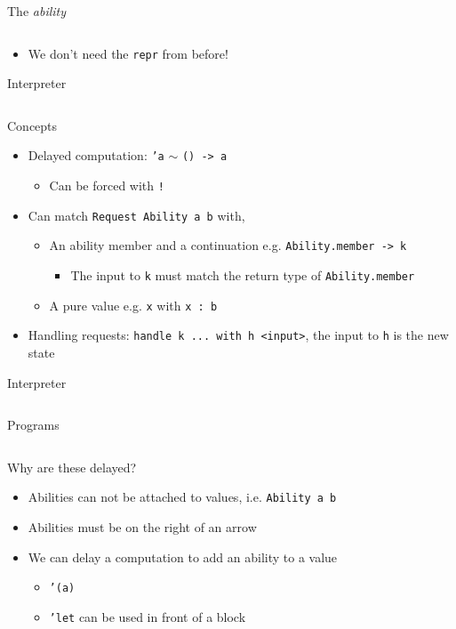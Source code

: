 \documentclass[hyperref={pdfpagelabels=false},12pt]{beamer}
\newcommand{\code}[2]{\texttt{#2}}
\newcommand{\haskell}[1]{\code{haskell}{#1}}
\newcommand{\txt}[1]{\code{text}{#1}}
\newcommand{\pygmentLines}[5]{\inputminted[bgcolor=lightgray,linenos,fontsize=#1,firstline=#2,lastline=#3,autogobble]{#4}{#5}}
\begin{document}
\begin{frame}{The \textit{ability}}
  \pygmentLines{\scriptsize}{41}{44}{haskell}{code/ability.u}
  \begin{itemize}
    \item We don't need the \haskell{repr} from before!
  \end{itemize}
\end{frame}

\begin{frame}{Interpreter}
  \pygmentLines{\footnotesize}{11}{21}{text}{code/ability.u}
\end{frame}

\begin{frame}{Concepts}
  \begin{itemize}
    \item Delayed computation: \txt{'a} $\sim$ \txt{() -> a}
    \begin{itemize}
      \item Can be forced with \txt{!}
    \end{itemize}
    \item Can match \txt{Request {Ability a} b} with,
      \begin{itemize}
        \item An ability member and a continuation e.g. \txt{{Ability.member -> k}}
        \begin{itemize}
          \item The input to \txt{k} must match the return type of
            \txt{Ability.member}
        \end{itemize}
        \item A pure value e.g. \txt{{x}} with \txt{x : b}
      \end{itemize}
    \item Handling requests: \txt{handle k ... with h <input>}, the input to
      \txt{h} is the new state
  \end{itemize}
\end{frame}

\begin{frame}{Interpreter}
  \pygmentLines{\footnotesize}{11}{21}{text}{code/ability.u}
\end{frame}

\begin{frame}{Programs}
  \pygmentLines{\footnotesize}{23}{40}{text}{code/ability.u}
\end{frame}

\begin{frame}{Why are these delayed?}
  \begin{itemize}
    \item Abilities can not be attached to values, i.e. \txt{{Ability a} b}
    \item Abilities must be on the right of an arrow
    \item We can delay a computation to add an ability to a value
    \begin{itemize}
      \item \txt{'(a)}
      \item \txt{'let} can be used in front of a block
    \end{itemize}
  \end{itemize}
\end{frame}
\end{document}
